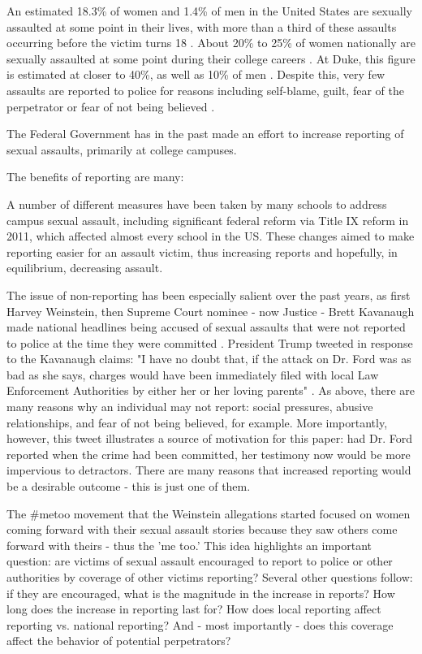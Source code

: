 \documentclass[AER,draftmode]{AEA}
\begin{document}

\clearpage
An estimated 18.3\% of women and 1.4\% of men in the United States are sexually assaulted at some point in their lives, with more than a third of these assaults occurring before the victim turns 18  \cite{black_national_2011}. About 20\% to 25\% of women nationally are sexually assaulted at some point during their college careers \cite{fisher_sexual_2000}. At Duke, this figure is estimated at closer to 40\%, as well as 10\% of men \cite{fox_university_2017}. Despite this, very few assaults are reported to police for reasons including self-blame, guilt, fear of the perpetrator or fear of not being believed \cite{du_mont_role_2003}. 

The Federal Government has in the past made an effort to increase reporting of sexual assaults, primarily at college campuses. 

The benefits of reporting are many:

A number of different measures have been taken by many schools to address campus sexual assault, including significant federal reform via Title IX reform in 2011, which affected almost every school in the US. These changes aimed to make reporting easier for an assault victim, thus increasing reports and hopefully, in equilibrium, decreasing assault.

The issue of non-reporting has been especially salient over the past years, as first Harvey Weinstein, then Supreme Court nominee - now Justice - Brett Kavanaugh made national headlines being accused of sexual assaults that were not reported to police at the time they were committed . President Trump tweeted in response to the Kavanaugh claims: "I have no doubt that, if the attack on Dr. Ford was as bad as she says, charges would have been immediately filed with local Law Enforcement Authorities by either her or her loving parents" \citeyear{trump_i_2018}. As above, there are many reasons why an individual may not report: social pressures, abusive relationships, and fear of not being believed, for example. More importantly, however, this tweet illustrates a source of motivation for this paper: had Dr. Ford reported when the crime had been committed, her testimony now would be more impervious to detractors. There are many reasons that increased reporting would be a desirable outcome - this is just one of them. 

The #metoo movement that the Weinstein allegations started focused on women coming forward with their sexual assault stories because they saw others come forward with theirs - thus the 'me too.' This idea highlights an important question: are victims of sexual assault encouraged to report to police or other authorities by coverage of other victims reporting? Several other questions follow: if they are encouraged, what is the magnitude in the increase in reports? How long does the increase in reporting last for? How does local reporting affect reporting vs. national reporting? And - most importantly - does this coverage affect the behavior of potential perpetrators?
\end{document}
